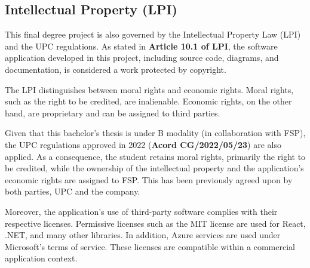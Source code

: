 \subsection{Intellectual Property (LPI)}

This final degree project is also governed by the Intellectual Property Law (LPI) and the UPC regulations. As stated in \textbf{Article 10.1 of LPI}, the software application developed in this project, including source code, diagrams, and documentation, is considered a work protected by copyright. \cite{upc-ipr-normativa}

The LPI distinguishes between moral rights and economic rights. Moral rights, such as the right to be credited, are inalienable. Economic rights, on the other hand, are proprietary and can be assigned to third parties.

Given that this bachelor's thesis is under B modality (in collaboration with FSP), the UPC regulations approved in 2022 (\textbf{Acord CG/2022/05/23}) are also applied. As a consequence, the student retains moral rights, primarily the right to be credited, while the ownership of the intellectual property and the application's economic rights are assigned to FSP.  This has been previously agreed upon by both parties, UPC and the company.

Moreover, the application's use of third-party software complies with their respective licenses. Permissive licenses such as the MIT license are used for React, .NET, and many other libraries. In addition, Azure services are used under Microsoft's terms of service. These licenses are compatible within a commercial application context.


